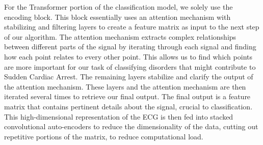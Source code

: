 \documentclass[
	a4paper, 
	10pt, 
	twoside, 
]{LTJournalArticle}
\begin{document}
For the Transformer portion of the classification model, we solely use the encoding block. This block essentially uses an attention mechanism with stabilizing and filtering layers to create a feature matrix as input to the next step of our algorithm. The attention mechanism extracts complex relationships between different parts of the signal by iterating through each signal and finding how each point relates to every other point. This allows us to find which points are more important for our task of classifying disorders that might contribute to Sudden Cardiac Arrest. The remaining layers stabilize and clarify the output of the attention mechanism. These layers and the attention mechanism are then iterated several times to retrieve our final output. The final output is a feature matrix that contains pertinent details about the signal, crucial to classification. This high-dimensional representation of the ECG is then fed into stacked convolutional auto-encoders to reduce the dimensionality of the data, cutting out repetitive portions of the matrix, to reduce computational load.
\\\\
\end{document}
